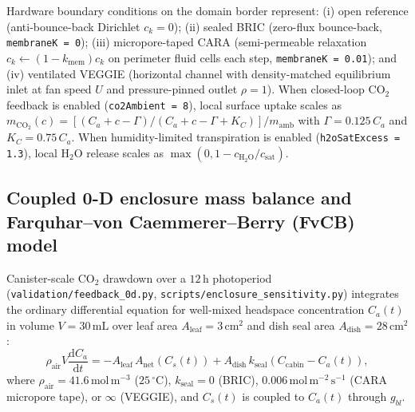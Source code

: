 \documentclass[final,5p,times,twocolumn,numbers,sort&compress]{elsarticle}
\newcommand{\molms}{\ensuremath{\mathrm{mol\,m^{-2}\,s^{-1}}}}
\begin{document}
Hardware boundary conditions on the domain border represent: (i) open reference (anti-bounce-back Dirichlet $c_k = 0$); (ii) sealed BRIC (zero-flux bounce-back, \texttt{membraneK = 0}); (iii) micropore-taped CARA (semi-permeable relaxation $c_k \leftarrow (1 - k_{\mathrm{mem}})c_k$ on perimeter fluid cells each step, \texttt{membraneK = 0.01}); and (iv) ventilated VEGGIE (horizontal channel with density-matched equilibrium inlet at fan speed $U$ and pressure-pinned outlet $\rho = 1$). When closed-loop $\mathrm{CO_2}$ feedback is enabled (\texttt{co2Ambient = 8}), local surface uptake scales as $m_{\mathrm{CO_2}}(c) = [(C_a + c - \Gamma)/(C_a + c - \Gamma + K_C)] / m_{\mathrm{amb}}$ with $\Gamma = 0.125\,C_a$ and $K_C = 0.75\,C_a$. When humidity-limited transpiration is enabled (\texttt{h2oSatExcess = 1.3}), local $\mathrm{H_2O}$ release scales as $\max(0, 1 - c_{\mathrm{H_2O}}/c_{\mathrm{sat}})$.

\subsection{Coupled 0-D enclosure mass balance and Farquhar--von Caemmerer--Berry (FvCB) model}

Canister-scale $\mathrm{CO_2}$ drawdown over a $12\,\mathrm{h}$ photoperiod (\texttt{validation/feedback\_0d.py}, \texttt{scripts/enclosure\_sensitivity.py}) integrates the ordinary differential equation for well-mixed headspace concentration $C_a(t)$ in volume $V = 30\,\mathrm{mL}$ over leaf area $A_{\text{leaf}} = 3\,\mathrm{cm^2}$ and dish seal area $A_{\text{dish}} = 28\,\mathrm{cm^2}$:
\begin{equation}
\rho_{\mathrm{air}}V\frac{\mathrm{d}C_a}{\mathrm{d}t} = -A_{\text{leaf}}\,A_{\mathrm{net}}(C_s(t)) + A_{\text{dish}}\,k_{\mathrm{seal}}\left(C_{\mathrm{cabin}} - C_a(t)\right),
\label{eq:0d_mass_balance}
\end{equation}
where $\rho_{\mathrm{air}} = 41.6\,\mathrm{mol\,m^{-3}}$ ($25\,^\circ\mathrm{C}$), $k_{\mathrm{seal}} = 0$ (BRIC), $0.006\,\molms$ (CARA micropore tape), or $\infty$ (VEGGIE), and $C_s(t)$ is coupled to $C_a(t)$ through $g_{bl}$.
\end{document}
